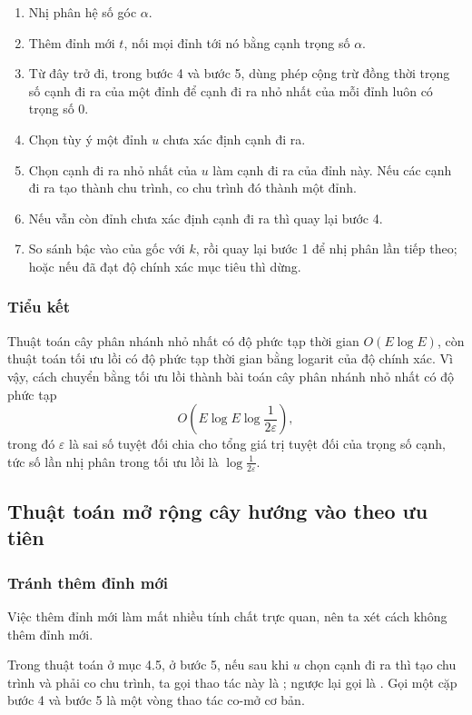 \documentclass[11pt]{article}
\begin{document}
\begin{enumerate}
  \item Nhị phân hệ số góc \(\alpha\).
  \item Thêm đỉnh mới \(t\), nối mọi đỉnh tới nó bằng cạnh trọng số \(\alpha\).
  \item Từ đây trở đi, trong bước 4 và bước 5, dùng phép cộng trừ đồng thời
  trọng số cạnh đi ra của một đỉnh để cạnh đi ra nhỏ nhất của mỗi đỉnh luôn có
  trọng số \(0\).
  \item Chọn tùy ý một đỉnh \(u\) chưa xác định cạnh đi ra.
  \item Chọn cạnh đi ra nhỏ nhất của \(u\) làm cạnh đi ra của đỉnh này. Nếu các
  cạnh đi ra tạo thành chu trình, co chu trình đó thành một đỉnh.
  \item Nếu vẫn còn đỉnh chưa xác định cạnh đi ra thì quay lại bước 4.
  \item So sánh bậc vào của gốc với \(k\), rồi quay lại bước 1 để nhị phân lần
  tiếp theo; hoặc nếu đã đạt độ chính xác mục tiêu thì dừng.
\end{enumerate}

\subsubsection{Tiểu kết}

Thuật toán cây phân nhánh nhỏ nhất có độ phức tạp thời gian \(O(E\log E)\), còn
thuật toán tối ưu lồi có độ phức tạp thời gian bằng logarit của độ chính xác.
Vì vậy, cách chuyển bằng tối ưu lồi thành bài toán cây phân nhánh nhỏ nhất có
độ phức tạp
\[
O\left(E\log E\log\frac{1}{2\varepsilon}\right),
\]
trong đó \(\varepsilon\) là sai số tuyệt đối chia cho tổng giá trị tuyệt đối của
trọng số cạnh, tức số lần nhị phân trong tối ưu lồi là
\(\log\frac{1}{2\varepsilon}\).

\subsection{Thuật toán mở rộng cây hướng vào theo ưu tiên}

\subsubsection{Tránh thêm đỉnh mới}

Việc thêm đỉnh mới làm mất nhiều tính chất trực quan, nên ta xét cách không thêm
đỉnh mới.

Trong thuật toán ở mục 4.5, ở bước 5, nếu sau khi \(u\) chọn cạnh đi ra thì tạo
chu trình và phải co chu trình, ta gọi thao tác này là ; ngược lại
gọi là . Gọi một cặp bước 4 và bước 5 là một vòng thao tác co-mở
cơ bản.
\end{document}
